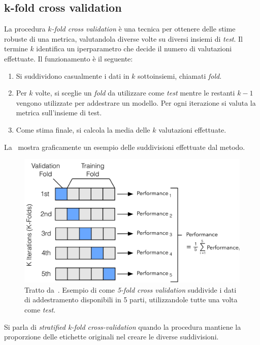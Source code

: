 \subsection{k-fold cross validation}
La procedura $k$\emph{-fold cross validation} è una tecnica per ottenere delle stime robuste di una metrica, valutandola diverse volte su diversi insiemi di \emph{test}.
Il termine $k$ identifica un iperparametro che decide il numero di valutazioni effettuate.
Il funzionamento è il seguente:
\begin{enumerate}
    \item Si suddividono casualmente i dati in $k$ sottoinsiemi, chiamati \emph{fold}.
    \item Per $k$ volte, si sceglie un \emph{fold} da utilizzare come \emph{test} mentre le restanti $k-1$ vengono utilizzate per addestrare un modello. Per ogni iterazione si valuta la metrica sull'insieme di test.
    \item Come stima finale, si calcola la media delle $k$ valutazioni effettuate.
\end{enumerate}
La~ mostra graficamente un esempio delle suddivisioni effettuate dal metodo.
\begin{figure}
    \centering
    \includegraphics[width=0.7\linewidth]{img/kfoldCV.jpg}
    \caption{Tratto da~\cite{model_evaluation}. Esempio di come \emph{5-fold cross validation} suddivide i dati di addestramento disponibili in 5 parti, utilizzandole tutte una volta come \emph{test}.}
    \label{fig:kfoldcv}
\end{figure}
Si parla di \emph{stratified k-fold cross-validation} quando la procedura mantiene la proporzione delle etichette originali nel creare le diverse suddivisioni.


